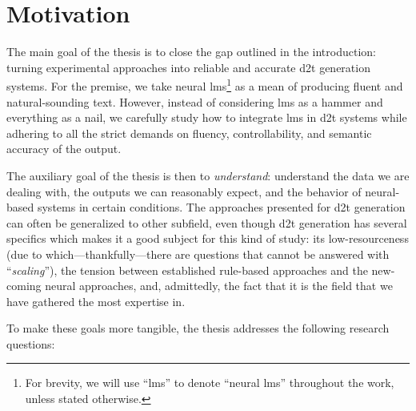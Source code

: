 \section{Motivation}
\label{sec:rq}

The main goal of the thesis is to close the gap outlined in the introduction: turning experimental approaches into reliable and accurate \ac{d2t} generation systems. For the premise, we take neural \acp{lm}\footnote{For brevity, we will use ``\acp{lm}'' to denote ``neural \acp{lm}'' throughout the work, unless stated otherwise.} as a mean of producing fluent and natural-sounding text. However, instead of considering \acp{lm} as a hammer and everything as a nail, we carefully study how to integrate \acp{lm} in \ac{d2t} systems while adhering to all the strict demands on fluency, controllability, and semantic accuracy of the output.

The auxiliary goal of the thesis is then to \textit{understand}: understand the data we are dealing with, the outputs we can reasonably expect, and the behavior of neural-based systems in certain conditions. The approaches presented for \ac{d2t} generation can often be generalized to other subfield, even though \ac{d2t} generation has several specifics which makes it a good subject for this kind of study: its low-resourceness (due to which---thankfully---there are questions that cannot be answered with ``\emph{scaling}''), the tension between established rule-based approaches and the new-coming neural approaches, and, admittedly, the fact that it is the field that we have gathered the most expertise in.

To make these goals more tangible, the thesis addresses the following research questions:

